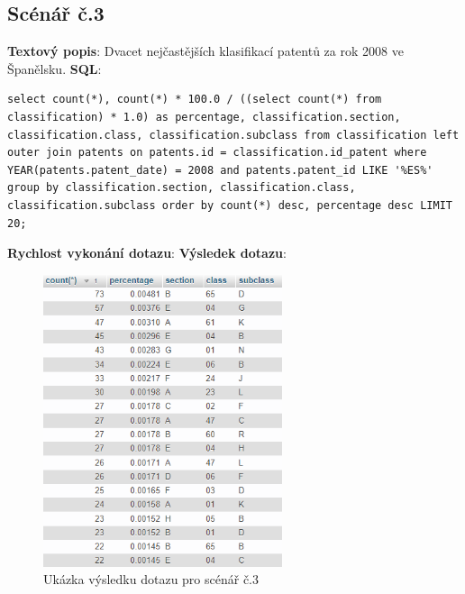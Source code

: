 \subsection{Scénář č.3}
\textbf{Textový popis}: Dvacet nejčastějších klasifikací patentů za rok 2008 ve Španělsku.
\newline
\textbf{SQL}:
\begin{lstlisting}[label = {lst:elements_a}]
select count(*), count(*) * 100.0 / ((select count(*) from classification) * 1.0) as percentage, classification.section, classification.class, classification.subclass from classification left outer join patents on patents.id = classification.id_patent where YEAR(patents.patent_date) = 2008 and patents.patent_id LIKE '%ES%' group by classification.section, classification.class, classification.subclass order by count(*) desc, percentage desc LIMIT 20;
\end{lstlisting}
\textbf{Rychlost vykonání dotazu}: 
\newline
\textbf{Výsledek dotazu}:
\begin{figure}[H]
\centering
\includegraphics[width=7cm]{img/scenare/scenar_3}
\caption{Ukázka výsledku dotazu pro scénář č.3}
\label{fig:scenar3}
\end{figure}

